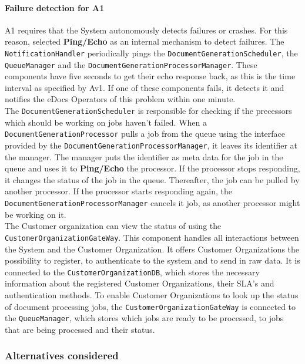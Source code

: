 \documentclass[a4paper,10pt]{article}
\begin{document}
\paragraph{Failure detection for A1}
A1 requires that the System autonomously detects failures or crashes. For this reason, selected \textbf{Ping/Echo} as an internal mechanism to detect failures. The \texttt{NotificationHandler} periodically pings the \texttt{DocumentGenerationScheduler}, the \texttt{QueueManager} and the \texttt{DocumentGenerationProcessorManager}. These components have five seconds to get their echo response back, as this is the time interval as specified by Av1. If one of these components fails, it detects it and notifies the eDocs Operators of this problem within one minute.\\
The \texttt{DocumentGenerationScheduler} is responsible for checking if the precessors which should be working on jobs haven't failed. When a \texttt{DocumentGenerationProcessor} pulls a job from the queue using the interface provided by the \texttt{DocumentGenerationProcessorManager}, it leaves its identifier at the manager. The manager puts the identifier as meta data for the job in the queue and uses it to \textbf{Ping/Echo} the processor. If the processor stops responding, it changes the status of the job in the queue. Thereafter, the job can be pulled by another processor. If the processor starts responding again, the \texttt{DocumentGenerationProcessorManager} cancels it job, as another processor might be working on it.\\
The Customer organization can view the status of using the \texttt{CustomerOrganizationGateWay}. This component handles all interactions between the System and the Customer Organization. It offers Customer Organizations the possibility to register, to authenticate to the system and to send in raw data. It is connected to the \texttt{CustomerOrganizationDB}, which stores the necessary information about the registered Customer Organizations, their SLA's and authentication methods. To enable Customer Organizations to look up the status of document processing jobs, the \texttt{CustomerOrganizationGateWay} is connected to the \texttt{QueueManager}, which stores which jobs are ready to be processed, to jobs that are being processed and their status.

\subsubsection*{Alternatives considered}
\end{document}
